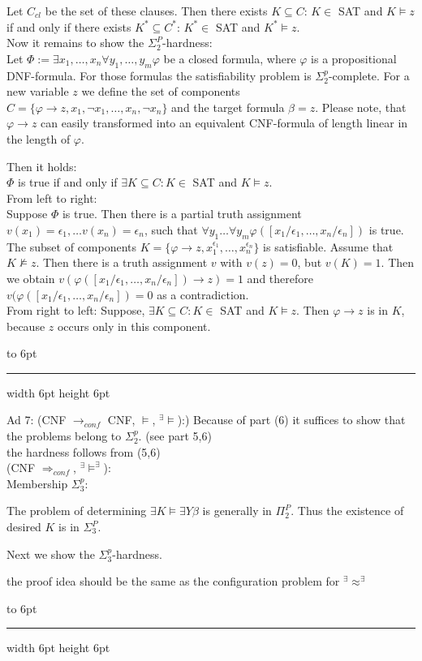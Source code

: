 \documentclass[12pt]{article}
\newcommand{\AM}{\mbox{$^\exists\!\!\models$}}
\newcommand{\AMB}{\mbox{$^\exists\!\!\models^\exists$}}
\newcommand{\AEQB}{\mbox{$^\exists\!\!\approx^\exists$}}
\newenvironment{proof}{\parindent=0pt{\bf Proof: }}{
   \hspace*{\fill}\hbox to 6pt{\leaders\hrule width 6pt height 6pt\hfill}\par}
\begin{document}
\begin{proof}
Let $C_{cl}$ be the set of these clauses. Then there exists $K \subseteq C$: $K \in$ SAT and $K \models z$ if and only if
there exists $K^* \subseteq C^*$: $K^* \in$ SAT and $K^* \models z$.\\

Now it remains to show the $\Sigma_2^P$-hardness:\\
Let $\Phi:= \exists x_1, \ldots, x_n \forall y_1, \ldots, y_m \varphi$ be a closed formula, where
$\varphi$ is a propositional DNF-formula. For those formulas the satisfiability problem is $\Sigma^p_2$-complete.
For a new variable $z$ we define the set of components\\
$C= \{ \varphi \rightarrow z, x_1, \neg x_1, \ldots, x_n, \neg x_n\}$ and the target formula $\beta=z$. Please note, that $\varphi \rightarrow z$ can easily transformed into an equivalent CNF-formula of length linear in the length of
$\varphi$.

Then it holds:\\
$\Phi$ is true if and only if $\exists K \subseteq C: K \in$ SAT and $K \models z$.\\
From left to right:\\
Suppose $\Phi$ is true. Then there is a partial truth assignment $v(x_1)= \epsilon_1, \ldots v(x_n)= \epsilon_n$, such
that $\forall y_1 \ldots \forall y_m \varphi([x_1/\epsilon_1, \ldots, x_n/\epsilon_n])$ is true. The subset of components
$K= \{ \varphi \rightarrow z, x_1^{\epsilon_1}, \ldots, x_n^{\epsilon_n}\}$ is satisfiable. Assume that $K\not \models z$.
Then there is a truth assignment $v$ with $v(z)=0$, but $v(K)=1$. Then we obtain $v(\varphi([x_1/\epsilon_1, \ldots, x_n/ \epsilon_n]) \rightarrow z)=1$ and therefore $v(\varphi([x_1/\epsilon_1, \ldots, x_n/ \epsilon_n])=0$ as a contradiction.\\

From right to left: Suppose, $\exists K \subseteq C: K \in$ SAT and $K \models z$. Then $\varphi \rightarrow z$ is in $K$,
because $z$ occurs only in this component.
\end{proof}

\vspace*{3mm}
\begin{proof}
Ad 7: (CNF $\longrightarrow_{conf}$ CNF, $\models$, \AM):)
Because of part (6) it suffices to show that the problems belong to $\Sigma_2^p$.
(see part 5,6)\\
the hardness follows from (5,6)\\

(CNF $\Longrightarrow_{conf}$, \AMB):\\
Membership $\Sigma_3^p$:

\color{red} The problem of determining
$\exists K\models \exists Y\beta$ is generally in $\Pi^P_2$. Thus the existence of desired $K$ is in $\Sigma_3^P$.
\color{black}


Next we show the $\Sigma^p_3$-hardness.

\color{red}
the proof idea should be the same as the configuration problem for \AEQB
\color{black}

\end{proof}
\end{document}
